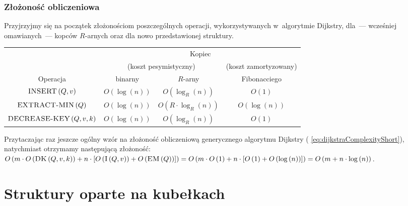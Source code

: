 \subsubsection{Złożoność obliczeniowa}

Przyjrzyjmy się na początek złożonościom poszczególnych operacji, wykorzystywanych w~algorytmie Dijkstry, dla~--- wcześniej omawianych~--- kopców $R$-arnych oraz dla nowo przedstawionej struktury.

\begin{center}
	\begin{tabular}{cccc}
		& \multicolumn{3}{c}{Kopiec} \\
		\cline{2-4}
		& \multicolumn{2}{c}{\small{(koszt pesymistyczny)}} & \small{(koszt zamortyzowany)} \\
		\cline{2-4}
		Operacja & binarny & $R$-arny & Fibonacciego \\
		\hline
		$\textrm{\textsc{INSERT}} \left( Q, v \right)$ & $O \left( \log \left( n \right) \right)$ & $O \left( \log_{R} \left( n \right) \right)$ & $ O \left( 1 \right)$ \\
		$\textrm{\textsc{EXTRACT-MIN}} \left( Q \right)$ & $O \left( \log \left( n \right) \right)$ & $O \left( R \cdot \log_{R} \left( n \right) \right)$ & $O \left( \log \left( n \right) \right)$ \\
		$\textrm{\textsc{DECREASE-KEY}} \left( Q, v, k \right)$ & $O \left( \log \left( n \right) \right)$ & $O \left( \log_{R} \left( n \right) \right)$ & $ O \left( 1 \right)$ \\
		\hline
	\end{tabular}
\end{center}

Przytaczając raz jeszcze ogólny wzór na złożoność obliczeniową generycznego algorytmu Dijkstry ( \ref{eq:dijkstraComplexityShort}), natychmiast otrzymamy następującą złożoność: $ O \left( m \cdot O \left( \textrm{\textsc{DK}} \left( Q, v, k \right) \right) + n \cdot \left[ O \left( \textrm{\textsc{I}} \left( Q, v \right) \right) + O \left( \textrm{\textsc{EM}} \left( Q \right) \right) \right] \right) = O \left( m \cdot O \left( 1 \right) + n \cdot \left[ O \left( 1 \right) + O \left( \log \left( n \right) \right) \right] \right) = O \left( m + n \cdot \log \left( n \right) \right)$.

\newpage

\section{Struktury oparte na kubełkach}
\label{sec:dijkstraBuckets}

